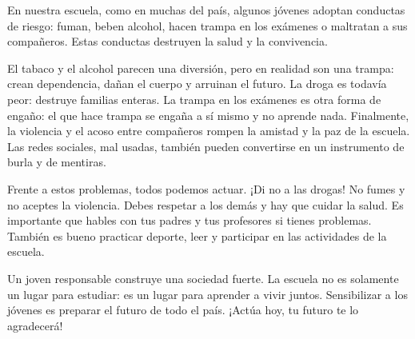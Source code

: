 \documentclass[11pt]{article}
\begin{document}
\begin{textebox}
En nuestra escuela, como en muchas del país, algunos jóvenes adoptan conductas de riesgo: fuman, beben alcohol, hacen trampa en los exámenes o maltratan a sus compañeros. Estas conductas destruyen la salud y la convivencia.

El tabaco y el alcohol parecen una diversión, pero en realidad son una trampa: crean dependencia, dañan el cuerpo y arruinan el futuro. La droga es todavía peor: destruye familias enteras. La trampa en los exámenes es otra forma de engaño: el que hace trampa se engaña a sí mismo y no aprende nada. Finalmente, la violencia y el acoso entre compañeros rompen la amistad y la paz de la escuela. Las redes sociales, mal usadas, también pueden convertirse en un instrumento de burla y de mentiras.

Frente a estos problemas, todos podemos actuar. ¡Di no a las drogas! No fumes y no aceptes la violencia. Debes respetar a los demás y hay que cuidar la salud. Es importante que hables con tus padres y tus profesores si tienes problemas. También es bueno practicar deporte, leer y participar en las actividades de la escuela.

Un joven responsable construye una sociedad fuerte. La escuela no es solamente un lugar para estudiar: es un lugar para aprender a vivir juntos. Sensibilizar a los jóvenes es preparar el futuro de todo el país. ¡Actúa hoy, tu futuro te lo agradecerá!
\end{textebox}
\end{document}
